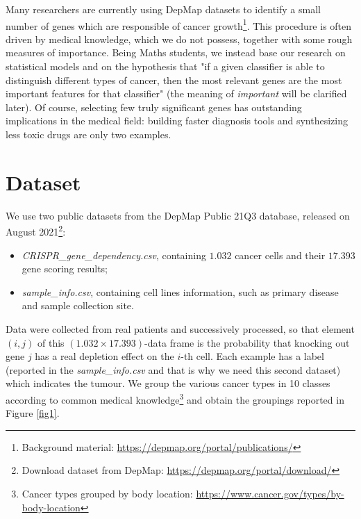 \documentclass[a4paper,11pt, oneside]{article}  %
\begin{document}
Many researchers are currently using DepMap datasets to identify a small number of genes which are responsible of cancer growth\footnote{Background material: \url{https://depmap.org/portal/publications/}}. This procedure is often driven by medical knowledge,  which we do not possess,  together with some rough measures of importance.  Being Maths students, we instead base our research on statistical models and on the hypothesis that "if a given classifier is able to distinguish different types of cancer,  then the most relevant genes are the most important features for that classifier" (the meaning of \textit{important} will be clarified later).  Of course,  selecting few truly significant genes has outstanding implications in the medical field: building faster diagnosis tools and synthesizing less toxic drugs are only two examples. 


\section{Dataset}
We use two public datasets from the DepMap Public 21Q3 database,  released on August 2021\footnote{Download dataset from DepMap:  \url{https://depmap.org/portal/download/}}:
\begin{itemize}
	\item \textit{CRISPR\_gene\_dependency.csv}, containing $1.032$ cancer cells and their $17.393$ gene scoring results;
	\item \textit{sample\_info.csv}, containing cell lines information,  such as primary disease and sample collection site.
\end{itemize}
Data were collected from real patients and successively processed,  so that element $(i, j)$ of this $(1.032 \times 17.393)$-data frame is the probability that knocking out gene $j$ has a real depletion effect on the $i$-th cell.  Each example has a label (reported in the \textit{sample\_info.csv} and that is why we need this second dataset) which indicates the tumour.  We group the various cancer types in 10 classes according to common medical knowledge\footnote{Cancer types grouped by body location: \url{https://www.cancer.gov/types/by-body-location}} and obtain the groupings reported in Figure \ref{fig1}. 
\end{document}

